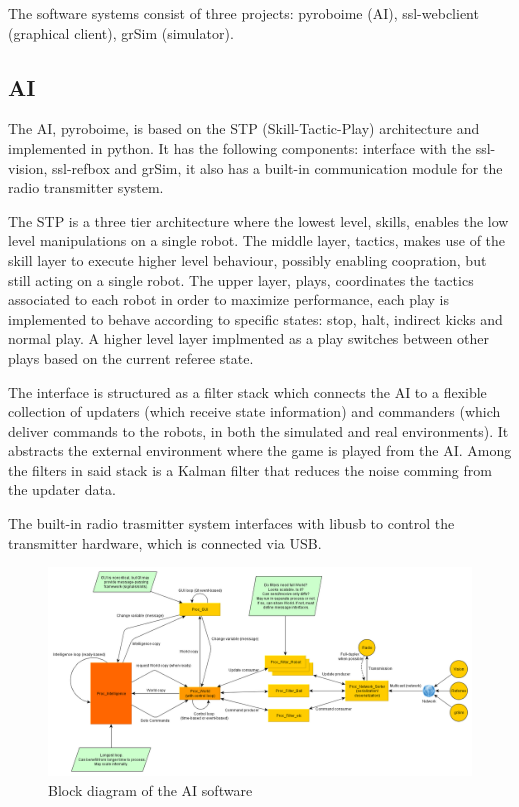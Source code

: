 \documentclass{llncs}
\begin{document}
The software systems consist of three projects: pyroboime (AI), ssl-webclient (graphical client), grSim (simulator).

\subsection{AI}

The AI, pyroboime, is based on the STP (Skill-Tactic-Play) architecture and implemented in python.
It has the following components: interface with the ssl-vision, ssl-refbox and grSim, it also has a built-in communication module for the radio transmitter system.

The STP is a three tier architecture where the lowest level, skills, enables the low level manipulations on a single robot.
The middle layer, tactics, makes use of the skill layer to execute higher level behaviour, possibly enabling coopration, but still acting on a single robot.
The upper layer, plays, coordinates the tactics associated to each robot in order to maximize performance, each play is implemented to behave according to specific states: stop, halt, indirect kicks and normal play.
A higher level layer implmented as a play switches between other plays based on the current referee state.

The interface is structured as a filter stack which connects the AI to a flexible collection of updaters (which receive state information) and commanders (which deliver commands to the robots, in both the simulated and real environments).
It abstracts the external environment where the game is played from the AI.
Among the filters in said stack is a Kalman filter that reduces the noise comming from the updater data.

The built-in radio trasmitter system interfaces with libusb to control the transmitter hardware, which is connected via USB.

\begin{figure}[thpb]
     \centering
     \includegraphics[width=15cm]{img/software-model.png}
     \caption{Block diagram of the AI software}
     \label{fluxogramSoftware}
\end{figure}
\end{document}
